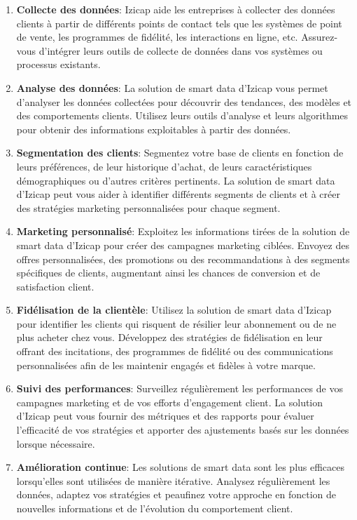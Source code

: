 \begin{enumerate}
    \item \textbf{Collecte des données}: Izicap aide les entreprises à collecter des données clients à partir de différents points de contact tels que les systèmes de point de vente, les programmes de fidélité, les interactions en ligne, etc. Assurez-vous d'intégrer leurs outils de collecte de données dans vos systèmes ou processus existants.
    \item \textbf{Analyse des données}: La solution de smart data d'Izicap vous permet d'analyser les données collectées pour découvrir des tendances, des modèles et des comportements clients. Utilisez leurs outils d'analyse et leurs algorithmes pour obtenir des informations exploitables à partir des données.
    \item \textbf{Segmentation des clients}: Segmentez votre base de clients en fonction de leurs préférences, de leur historique d'achat, de leurs caractéristiques démographiques ou d'autres critères pertinents. La solution de smart data d'Izicap peut vous aider à identifier différents segments de clients et à créer des stratégies marketing personnalisées pour chaque segment.
    \item \textbf{Marketing personnalisé}: Exploitez les informations tirées de la solution de smart data d'Izicap pour créer des campagnes marketing ciblées. Envoyez des offres personnalisées, des promotions ou des recommandations à des segments spécifiques de clients, augmentant ainsi les chances de conversion et de satisfaction client.
    \item \textbf{Fidélisation de la clientèle}: Utilisez la solution de smart data d'Izicap pour identifier les clients qui risquent de résilier leur abonnement ou de ne plus acheter chez vous. Développez des stratégies de fidélisation en leur offrant des incitations, des programmes de fidélité ou des communications personnalisées afin de les maintenir engagés et fidèles à votre marque.
    \item \textbf{Suivi des performances}: Surveillez régulièrement les performances de vos campagnes marketing et de vos efforts d'engagement client. La solution d'Izicap peut vous fournir des métriques et des rapports pour évaluer l'efficacité de vos stratégies et apporter des ajustements basés sur les données lorsque nécessaire.
    \item \textbf{Amélioration continue}: Les solutions de smart data sont les plus efficaces lorsqu'elles sont utilisées de manière itérative. Analysez régulièrement les données, adaptez vos stratégies et peaufinez votre approche en fonction de nouvelles informations et de l'évolution du comportement client.
\end{enumerate}


